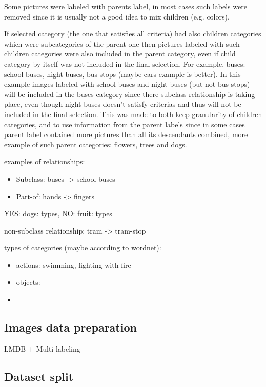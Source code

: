     Some pictures were labeled with parents label, in most cases such labels were removed since it is usually not a good idea to mix children (e.g. colors).
    
    
    If selected category (the one that satisfies all criteria) had also children categories which were subcategories of the parent one then pictures labeled with such children categories were also included in the parent category, even if child category by itself was not included in the final selection. For example, buses: school-buses, night-buses, bus-stops (maybe cars example is better). In this example images labeled with school-buses and night-buses (but not bus-stops) will be included in the buses category since there subclass relationship is taking place, even though night-buses doesn't satisfy criterias and thus will not be included in the final selection. This was made to both keep granularity of children categories, and to use information from the parent labels since in some cases parent label contained more pictures than all its descendants combined, more example of such parent categories: flowers, trees and dogs.
    
    examples of relationships:
    \begin{itemize}
        \item Subclass: buses -> school-buses
        \item Part-of: hands -> fingers
    \end{itemize}
    
    YES: dogs: types, NO: fruit: types
    
    non-subclass relationship: tram -> tram-stop
    
    types of categories (maybe according to wordnet):
    \begin{itemize}
        \item actions: swimming, fighting with fire
        \item objects: 
        \item
    \end{itemize}
    
    \subsection{Images data preparation}
    LMDB + Multi-labeling
    \subsection{Dataset split}
